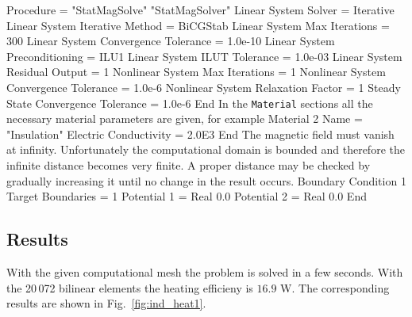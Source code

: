   Procedure = "StatMagSolve" "StatMagSolver"
  Linear System Solver = Iterative
  Linear System Iterative Method = BiCGStab
  Linear System Max Iterations = 300
  Linear System Convergence Tolerance = 1.0e-10
  Linear System Preconditioning = ILU1
  Linear System ILUT Tolerance = 1.0e-03
  Linear System Residual Output = 1
  Nonlinear System Max Iterations = 1
  Nonlinear System Convergence Tolerance = 1.0e-6
  Nonlinear System Relaxation Factor = 1
  Steady State Convergence Tolerance = 1.0e-6
End
\ttend
%
In the \texttt{Material} sections all the necessary 
material parameters are given, for example
\ttbegin
Material 2
  Name = "Insulation"
  Electric Conductivity = 2.0E3
End
\ttend
%
The magnetic field must vanish at infinity. Unfortunately the
computational domain is bounded and therefore the infinite
distance becomes very finite. A proper distance may be checked
by gradually increasing it until no change in the result occurs.
%
\ttbegin
Boundary Condition 1
  Target Boundaries = 1
  Potential 1 = Real 0.0
  Potential 2 = Real 0.0
End
\ttend

\subsection*{Results}

With the given computational mesh the problem is solved in 
a few seconds. With the 20\,072 bilinear elements the heating
efficieny is $16.9$ W. The corresponding results are shown
in Fig.~\ref{fig:ind_heat1}.

